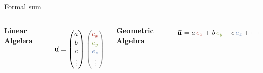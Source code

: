 \begin{frame}{Formal sum}
    \large
    \begin{columns}[t]  %
        \centering
        \textbf{Linear Algebra}
        \vspace{1em}

        \[
            \vec{\mathbf{u}} =
            \begin{pmatrix}
                a \\
                b \\
                c \\
                \vdots
            \end{pmatrix}
            \textcolor{gray}{
                \begin{pmatrix}
                    \textcolor{red}{e_x}   \\
                    \textcolor{green}{e_y} \\
                    \textcolor{blue}{e_z}  \\
                    \vdots
                \end{pmatrix}
            }
        \]

        \centering
        \textbf{Geometric Algebra}
        \vspace{3em}

        \[
            \vec{\mathbf{u}} =
            a\, \textcolor{red}{e_x} +
            b\, \textcolor{green}{e_y} +
            c\, \textcolor{blue}{e_z} + \cdots
        \]
    \end{columns}
\end{frame}


